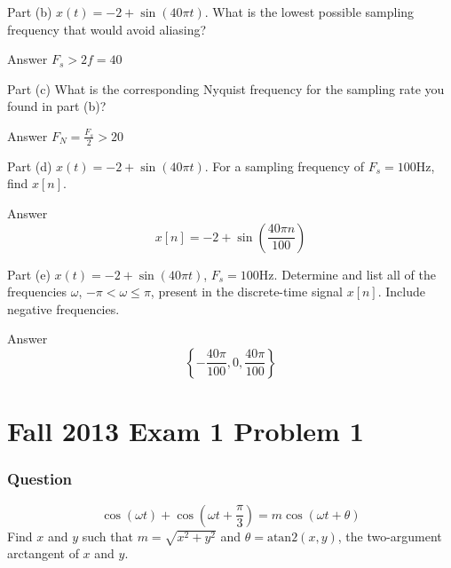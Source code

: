 \documentclass{beamer}
\begin{document}
\begin{frame}
  \begin{block}{Part (b)}
    $x(t)=-2+\sin(40\pi t)$.
    What is the lowest possible sampling frequency
    that would avoid aliasing?
  \end{block}
  \begin{block}{Answer}
    $F_s > 2f = 40$
  \end{block}
\end{frame}

\begin{frame}
  \begin{block}{Part (c)}
    What is the corresponding Nyquist frequency
    for the sampling rate you found in part (b)?
  \end{block}
  \begin{block}{Answer}
    $F_N = \frac{F_s}{2} > 20$
  \end{block}
\end{frame}

\begin{frame}
  \begin{block}{Part (d)}
    $x(t)=-2+\sin(40\pi t)$.
    For a sampling frequency of $F_s=100$Hz, find
    $x[n]$.
  \end{block}
  \begin{block}{Answer}
    \[
    x[n] = -2 + \sin\left(\frac{40\pi n}{100}\right)
    \]
  \end{block}
\end{frame}

\begin{frame}
  \begin{block}{Part (e)}
    $x(t)=-2+\sin(40\pi t)$,  $F_s=100$Hz.
    Determine and list all of the frequencies
    $\omega$, $-\pi<\omega\le\pi$, present in the discrete-time signal
    $x[n]$.  Include negative frequencies.
  \end{block}
  \begin{block}{Answer}
    \[
    \left\{ -\frac{40\pi}{100},0,\frac{40\pi}{100}\right\}
    \]
  \end{block}
\end{frame}

\section[13x1p1]{Fall 2013 Exam 1 Problem 1}
\setcounter{subsection}{1}

\begin{frame}
  \frametitle{Question}
  \[
  \cos(\omega t)+\cos(\omega t+\frac{\pi}{3})=m\cos(\omega t+\theta)
  \]
  Find $x$ and $y$ such that $m=\sqrt{x^2+y^2}$ and
  $\theta=\mbox{atan2}(x,y)$, the two-argument arctangent of $x$ and $y$.
\end{frame}
\end{document}

